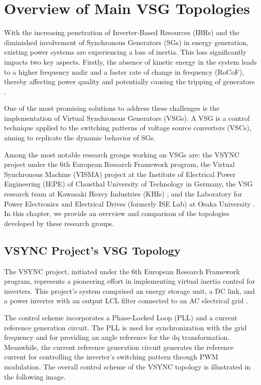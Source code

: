 \chapter{Overview of Main VSG Topologies}

With the increasing penetration of Inverter-Based Resources (IBRs) and the
diminished involvement of Synchronous Generators (SGs) in energy generation,
existing power systems are experiencing a loss of inertia. This loss
significantly impacts two key aspects. Firstly, the absence of kinetic energy in
the system leads to a higher frequency nadir and a faster rate of change in
frequency (RoCoF), thereby affecting power quality and potentially causing the
tripping of generators \cite{alipoor2015power}.

One of the most promising solutions to address these challenges is the
implementation of Virtual Synchronous Generators (VSGs). A VSG is a control
technique applied to the switching patterns of voltage source converters (VSCs),
aiming to replicate the dynamic behavior of SGs.

Among the most notable research groups working on VSGs are: the VSYNC project
\cite{visscher2008vsg} under the 6th European Research Framework program, the
Virtual Synchronous Machine (VISMA) project \cite{beck2007vsm} at the Institute
of Electrical Power Engineering (IEPE) of Clausthal University of Technology in
Germany, the VSG research team at Kawasaki Heavy Industries (KHIs)
\cite{hirase2013grid}, and the Laboratory for Power Electronics and Electrical
Drives (formerly ISE Lab) at Osaka University \cite{alipoor2015power,
sakimoto2011stabilization, liu2017vsg}. In this chapter, we provide an overview
and comparison of the topologies developed by these research groups.

\section{VSYNC Project's VSG Topology}

The VSYNC project, initiated under the 6th European Research Framework program,
represents a pioneering effort in implementing virtual inertia control for
inverters. This project's system comprised an energy storage unit, a DC link,
and a power inverter with an output LCL filter connected to an AC electrical
grid \cite{visscher2008vsg}.

The control scheme incorporates a Phase-Locked Loop (PLL) and a current
reference generation circuit. The PLL is used for synchronization with the grid
frequency and for providing an angle reference for the dq transformation.
Meanwhile, the current reference generation circuit generates the reference
current for controlling the inverter's switching pattern through PWM modulation.
The overall control scheme of the VSYNC topology is illustrated in the following
image.

